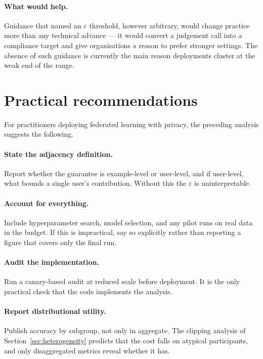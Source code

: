 \documentclass[11pt,a4paper]{article}
\begin{document}
\paragraph{What would help.}
Guidance that named an $\varepsilon$ threshold, however arbitrary, would
change practice more than any technical advance --- it would convert a
judgement call into a compliance target and give organisations a reason to
prefer stronger settings. The absence of such guidance is currently the main
reason deployments cluster at the weak end of the range.

\section{Practical recommendations}
\label{sec:recommendations}

For practitioners deploying federated learning with privacy, the preceding
analysis suggests the following.

\paragraph{State the adjacency definition.}
Report whether the guarantee is example-level or user-level, and if user-level,
what bounds a single user's contribution. Without this the $\varepsilon$ is
uninterpretable.

\paragraph{Account for everything.}
Include hyperparameter search, model selection, and any pilot runs on real
data in the budget. If this is impractical, say so explicitly rather than
reporting a figure that covers only the final run.

\paragraph{Audit the implementation.}
Run a canary-based audit at reduced scale before deployment. It is the only
practical check that the code implements the analysis.

\paragraph{Report distributional utility.}
Publish accuracy by subgroup, not only in aggregate. The clipping analysis of
Section~\ref{sec:heterogeneity} predicts that the cost falls on atypical
participants, and only disaggregated metrics reveal whether it has.
\end{document}
